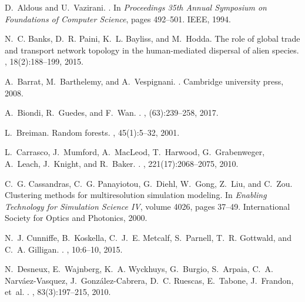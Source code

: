 \documentclass[11pt]{article}
\theoremstyle{definition}
\begin{document}
\begin{thebibliography}{10}

D.~Aldous and U.~Vazirani.
.
\newblock In {\em Proceedings 35th Annual Symposium on Foundations of Computer
  Science}, pages 492--501. IEEE, 1994.

N.~C. Banks, D.~R. Paini, K.~L. Bayliss, and M.~Hodda.
\newblock The role of global trade and transport network topology in the
  human-mediated dispersal of alien species.
, 18(2):188--199, 2015.

A.~Barrat, M.~Barthelemy, and A.~Vespignani.
.
\newblock Cambridge university press, 2008.

A.~Biondi, R.~Guedes, and F.~Wan.
.
, (63):239--258, 2017.

L.~Breiman.
\newblock Random forests.
, 45(1):5--32, 2001.

L.~Carrasco, J.~Mumford, A.~MacLeod, T.~Harwood, G.~Grabenweger, A.~Leach,
  J.~Knight, and R.~Baker.
.
, 221(17):2068--2075, 2010.

C.~G. Cassandras, C.~G. Panayiotou, G.~Diehl, W.~Gong, Z.~Liu, and C.~Zou.
\newblock Clustering methods for multiresolution simulation modeling.
\newblock In {\em Enabling Technology for Simulation Science IV}, volume 4026,
  pages 37--49. International Society for Optics and Photonics, 2000.

N.~J. Cunniffe, B.~Koskella, C.~J.~E. Metcalf, S.~Parnell, T.~R. Gottwald, and
  C.~A. Gilligan.
.
, 10:6--10, 2015.

N.~Desneux, E.~Wajnberg, K.~A. Wyckhuys, G.~Burgio, S.~Arpaia, C.~A.
  Narv{\'a}ez-Vasquez, J.~Gonz{\'a}lez-Cabrera, D.~C. Ruescas, E.~Tabone,
  J.~Frandon, et~al.
.
, 83(3):197--215, 2010.


\end{thebibliography}
\end{document}
